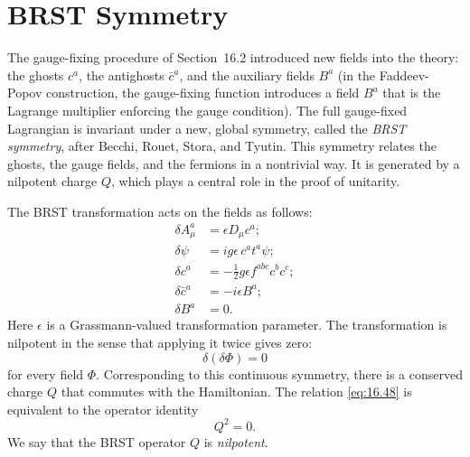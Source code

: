 \section{BRST Symmetry}

The gauge-fixing procedure of Section~16.2 introduced new fields into the
theory: the ghosts $c^a$, the antighosts $\bar{c}^a$, and the auxiliary
fields $B^a$ (in the Faddeev-Popov construction, the gauge-fixing function
introduces a field $B^a$ that is the Lagrange multiplier enforcing the gauge
condition).  The full gauge-fixed Lagrangian is invariant under a new, global
symmetry, called the \emph{BRST symmetry}, after Becchi, Rouet, Stora, and
Tyutin.  This symmetry relates the ghosts, the gauge fields, and the
fermions in a nontrivial way.  It is generated by a nilpotent charge $Q$,
which plays a central role in the proof of unitarity.

The BRST transformation acts on the fields as follows:
\begin{equation}
  \begin{aligned}
    \delta A^a_\mu &= \epsilon D_\mu c^a;\\
    \delta\psi &= ig\epsilon\,c^a t^a\psi;\\
    \delta c^a &= -\frac{1}{2}g\epsilon f^{abc}c^b c^c;\\
    \delta\bar{c}^a &= -i\epsilon B^a;\\
    \delta B^a &= 0 .
  \end{aligned}
  \label{eq:16.45}
\end{equation}
Here $\epsilon$ is a Grassmann-valued transformation parameter.  The
transformation is nilpotent in the sense that applying it twice gives zero:
\begin{equation}
  \delta(\delta\Phi) = 0
  \label{eq:16.48}
\end{equation}
for every field $\Phi$.  Corresponding to this continuous symmetry, there is
a conserved charge $Q$ that commutes with the Hamiltonian.  The relation
\eqref{eq:16.48} is equivalent to the operator identity
\begin{equation}
  Q^2 = 0 .
  \label{eq:16.50}
\end{equation}
We say that the BRST operator $Q$ is \emph{nilpotent}.

